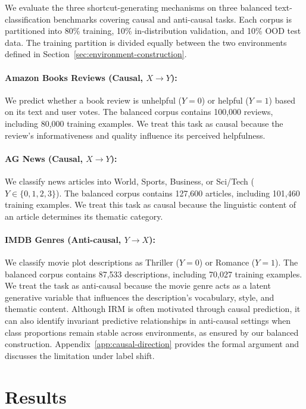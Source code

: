 \documentclass[11pt]{article}
\theoremstyle{definition}
\theoremstyle{plain}
\begin{document}
We evaluate the three shortcut-generating mechanisms on three balanced text-classification benchmarks covering causal and anti-causal tasks. Each corpus is partitioned into 80\% training, 10\% in-distribution validation, and 10\% OOD test data. The training partition is divided equally between the two environments defined in Section~\ref{sec:environment-construction}.

\paragraph{Amazon Books Reviews \citep{hou2026bridging} (Causal, $X \rightarrow Y$):} We predict whether a book review is unhelpful ($Y=0$) or helpful ($Y=1$) based on its text and user votes. The balanced corpus contains 100,000 reviews, including 80,000 training examples. We treat this task as causal because the review's informativeness and quality influence its perceived helpfulness.

\paragraph{AG News \citep{zhang2015characterlevel} (Causal, $X \rightarrow Y$):} We classify news articles into World, Sports, Business, or Sci/Tech ($Y\in\{0,1,2,3\}$). The balanced corpus contains 127,600 articles, including 101,460 training examples. We treat this task as causal because the linguistic content of an article determines its thematic category.

\paragraph{IMDB Genres \citep{maas-etal-2011-learning} (Anti-causal, $Y \rightarrow X$):} We classify movie plot descriptions as Thriller ($Y=0$) or Romance ($Y=1$). The balanced corpus contains 87,533 descriptions, including 70,027 training examples. We treat the task as anti-causal because the movie genre acts as a latent generative variable that influences the description's vocabulary, style, and thematic content. Although IRM is often motivated through causal prediction, it can also identify invariant predictive relationships in anti-causal settings when class proportions remain stable across environments, as ensured by our balanced construction. Appendix~\ref{app:causal-direction} provides the formal argument and discusses the limitation under label shift.


\section{Results}
\end{document}
